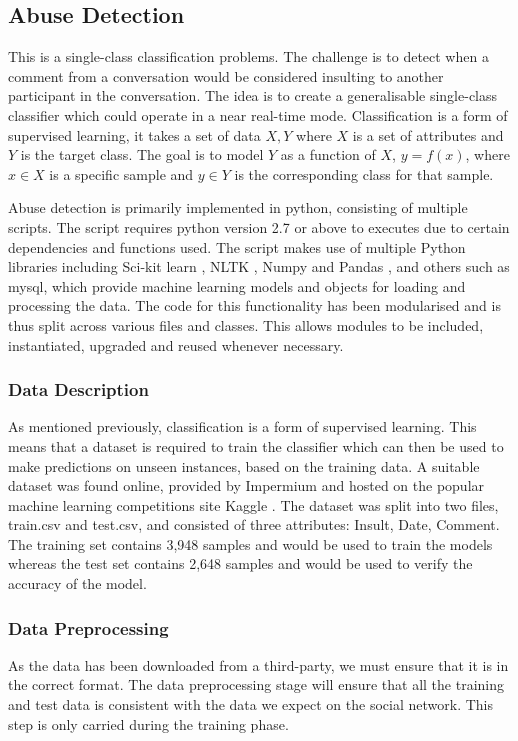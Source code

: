 \subsection{Abuse Detection}
This is a single-class classification problems. The challenge is to detect when a comment from a conversation would be considered insulting to another participant in the conversation. The idea is to create a generalisable single-class classifier which could operate in a near real-time mode. Classification is a form of supervised learning, it takes a set of data ${X, Y}$ where $X$ is a set of attributes and $Y$ is the target class. The goal is to model $Y$ as a function of $X$, $y = f(x)$, where $x \in X$ is a specific sample and $y \in Y$ is the corresponding class for that sample.

Abuse detection is primarily implemented in python, consisting of multiple scripts. The script requires python version 2.7 or above to executes due to certain dependencies and functions used. The script makes use of multiple Python libraries including Sci-kit learn \cite{scikit:home}, NLTK \cite{nltk}, Numpy \cite{Numpy} and Pandas \cite{Pandas}, and others such as mysql, which provide machine learning models and objects for loading and processing the data. The code for this functionality has been modularised and is thus split across various files and classes. This allows modules to be included, instantiated, upgraded and reused whenever necessary.

\subsubsection{Data Description}
As mentioned previously, classification is a form of supervised learning. This means that a dataset is required to train the classifier which can then be used to make predictions on unseen instances, based on the training data. A suitable dataset was found online, provided by Impermium and hosted on the popular machine learning competitions site Kaggle \cite{Kaggle:Dataset}. The dataset was split into two files, train.csv and test.csv, and consisted of three attributes: Insult, Date, Comment. The training set contains 3,948 samples and would be used to train the models whereas the test set contains 2,648 samples and would be used to verify the accuracy of the model.


\subsubsection{Data Preprocessing}
As the data has been downloaded from a third-party, we must ensure that it is in the correct format. The data preprocessing stage will ensure that all the training and test data is consistent with the data we expect on the social network. This step is only carried during the training phase.

